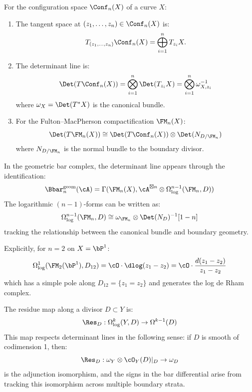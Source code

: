 \begin{proposition}
\label{prop:det-config}
For the configuration space $\Conf_n(X)$ of a curve $X$:
\begin{enumerate}[label=(\roman*)]
\item The tangent space at $(z_1, \ldots, z_n) \in \Conf_n(X)$ is:
\[
T_{(z_1, \ldots, z_n)} \Conf_n(X) = \bigoplus_{i=1}^n T_{z_i} X.
\]
\item The determinant line is:
\[
\Det(T\Conf_n(X)) = \bigotimes_{i=1}^n \Det(T_{z_i} X) = \bigotimes_{i=1}^n \omega_{X,z_i}^{-1}
\]
where $\omega_X = \Det(T^*X)$ is the canonical bundle.
\item For the Fulton--MacPherson compactification $\FM_n(X)$:
\[
\Det(T\FM_n(X)) \cong \Det(T\Conf_n(X)) \otimes \Det(N_{D/\FM_n})
\]
where $N_{D/\FM_n}$ is the normal bundle to the boundary divisor.
\end{enumerate}
\end{proposition}

\begin{construction}
\label{constr:det-bar}
In the geometric bar complex, the determinant line appears through the
identification:
\[
\Bbar^{\mathrm{geom}}_n(\cA) = \Gamma(\FM_n(X), \cA^{\boxtimes n} \otimes \Omega^{n-1}_{\log}(\FM_n, D))
\]
The logarithmic $(n-1)$-forms can be written as:
\[
\Omega^{n-1}_{\log}(\FM_n, D) \cong \omega_{\FM_n} \otimes \Det(N_D)^{-1}[1-n]
\]
tracking the relationship between the canonical bundle and boundary geometry.

Explicitly, for $n = 2$ on $X = \bP^1$:
\[
\Omega^1_{\log}(\FM_2(\bP^1), D_{12}) = \cO \cdot \dlog(z_1 - z_2) = \cO \cdot \frac{d(z_1 - z_2)}{z_1 - z_2}
\]
which has a simple pole along $D_{12} = \{z_1 = z_2\}$ and generates the
log de Rham complex.
\end{construction}

\begin{proposition}
\label{prop:det-residue}
The residue map along a divisor $D \subset Y$ is:
\[
\Res_D: \Omega^k_{\log}(Y, D) \to \Omega^{k-1}(D)
\]
This map respects determinant lines in the following sense: if $D$ is smooth
of codimension 1, then:
\[
\Res_D: \omega_Y \otimes \cO_Y(D)|_D \to \omega_D
\]
is the adjunction isomorphism, and the signs in the bar differential arise
from tracking this isomorphism across multiple boundary strata.
\end{proposition}


